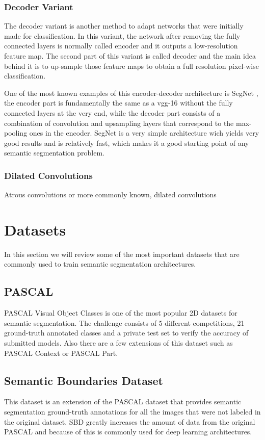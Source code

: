 \subsubsection{Decoder Variant}
The decoder variant is another method to adapt networks that were initially made for classification. In this variant, the network after removing the fully connected layers is normally called encoder and it outputs a low-resolution feature map. The second part of this variant is called decoder and the main idea behind it is to up-sample those feature maps to obtain a full resolution pixel-wise classification.

One of the most known examples of this encoder-decoder architecture is SegNet \cite{DBLP:journals/corr/BadrinarayananK15}, the encoder part is fundamentally the same as a \gls{vgg}-16 without the fully connected layers at the very end, while the decoder part consists of a combination of convolution and upsampling layers that correspond to the max-pooling ones in the encoder. SegNet is a very simple architecture wich yields very good results and is relatively fast, which makes it a good starting point of any semantic segmentation problem.


\subsubsection{Dilated Convolutions}
Atrous convolutions or more commonly known, dilated convolutions
  
\section{Datasets}
In this section we will review some of the most important datasets that are commonly used to train semantic segmentation architectures. 

\subsection{PASCAL}
PASCAL Visual Object Classes is one of the most popular 2D datasets for semantic segmentation. The challenge consists of 5 different competitions, 21 ground-truth annotated classes and a private test set to verify the accuracy of submitted models. Also there are a few extensions of this dataset such as PASCAL Context or PASCAL Part.

\subsection{Semantic Boundaries Dataset}
This dataset is an extension of the PASCAL dataset that provides semantic segmentation ground-truth annotations for all the images that were not labeled in the original dataset. SBD greatly increases the amount of data from the original PASCAL and because of this is commonly used for deep learning architectures.


